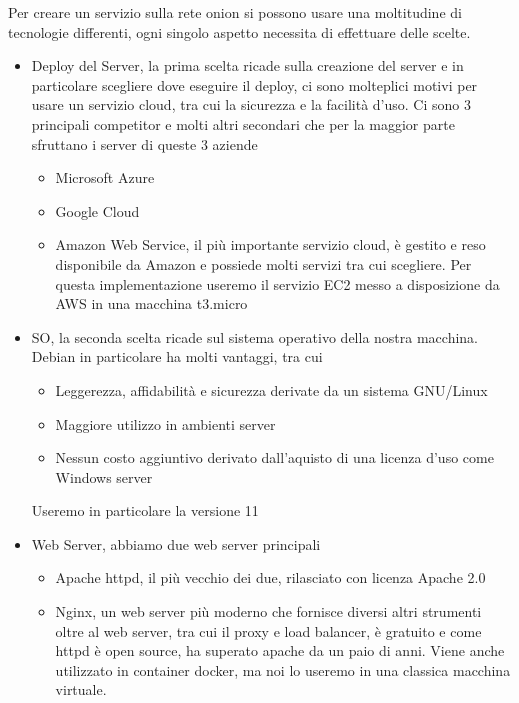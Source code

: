Per creare un servizio sulla rete onion si possono usare una moltitudine di tecnologie differenti, ogni singolo aspetto necessita di effettuare delle scelte. \\
\begin{itemize}
    \item Deploy del Server, la prima scelta ricade sulla creazione del server e in particolare scegliere dove eseguire il deploy, ci sono molteplici motivi per usare un servizio cloud, tra cui la sicurezza e la facilità d'uso. Ci sono 3 principali competitor e molti altri secondari che per la maggior parte sfruttano i server di queste 3 aziende
    \begin{itemize}
        \item Microsoft Azure
        \item Google Cloud
        \item Amazon Web Service, il più importante servizio cloud, è gestito e reso disponibile da Amazon e possiede molti servizi tra cui scegliere. Per questa implementazione useremo il servizio EC2 messo a disposizione da AWS in una macchina t3.micro
    \end{itemize}
    \item SO, la seconda scelta ricade sul sistema operativo della nostra macchina. Debian in particolare ha molti vantaggi, tra cui 
    \begin{itemize}
        \item Leggerezza, affidabilità e sicurezza derivate da un sistema GNU/Linux
        \item Maggiore utilizzo in ambienti server
        \item Nessun costo aggiuntivo derivato dall'aquisto di una licenza d'uso come Windows server
    \end{itemize}
    Useremo in particolare la versione 11
    \item Web Server, abbiamo due web server principali 
    \begin{itemize}
        \item Apache httpd, il più vecchio dei due, rilasciato con licenza Apache 2.0
        \item Nginx, un web server più moderno che fornisce diversi altri strumenti oltre al web server, tra cui il proxy e load balancer, è gratuito e come httpd è open source, ha superato apache da un paio di anni. Viene anche utilizzato in container docker, ma noi lo useremo in una classica macchina virtuale.
    \end{itemize}
\end{itemize}




